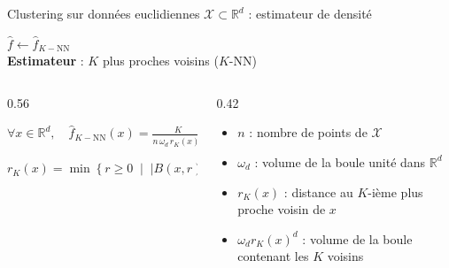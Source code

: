 \documentclass[A4,svgnames,9pt,aspectratio=169]{beamer}
\begin{document}
\begin{frame}{Clustering sur données euclidiennes $\mathcal{X} \subset \mathbb{R}^d$ : estimateur de densité}
    \begin{center}
        \Large $\widehat{f} \leftarrow \widehat{f}_{K-\text{NN}}$ \\[4pt]
        \normalsize \textbf{Estimateur} : $K$ plus proches voisins ($K$-NN)
    \end{center}
    
    \vspace{0.4cm}
    
    \begin{columns}[c, onlytextwidth]
        \begin{column}{0.56\textwidth}
            \begin{center}
                \vspace{0.2cm}
                {\Large{} $\forall x \in \mathbb{R}^d, \quad \widehat{f}_{K-\text{NN}}(x) = \frac{K}{n \, \omega_d \, r_K(x)^d}$}
                
                \vspace{1.0cm}
                
                {\large{} $r_K(x) = \min \left\{ r \ge 0 \;\middle|\; |B(x,r) \cap \mathcal{X}| \ge K \right\}$}
            \end{center}
        \end{column}
        
        \begin{column}{0.42\textwidth}
            \begin{itemize}
                \setlength{\itemsep}{8pt}
                \item \textbf{$n$} : nombre de points de $\mathcal{X}$
                \item \textbf{$\omega_d$} : volume de la boule unité dans $\mathbb{R}^d$
                \item \textbf{$r_K(x)$} : distance au $K$-ième plus proche voisin de $x$
                \item \textbf{$\omega_d r_K(x)^d$} : volume de la boule contenant les $K$ voisins
            \end{itemize}
        \end{column}
    \end{columns}
\end{frame}
\end{document}
